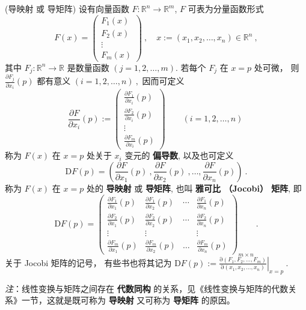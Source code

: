 \begin{definition}{(导映射 或 导矩阵)}
设有向量函数 $F:\mathbb{R}^{n}\rightarrow\mathbb{R}^{m}$, $F$ 可表为分量函数形式
$$
F(x)=\left(\begin{array}{c}
F_{1}(x)\\
F_{2}(x)\\
\vdots\\
F_{m}(x)
\end{array}\right)~,\quad x:=(x_{1},x_{2},\ldots,x_{n})\in\mathbb{R}^{n}~,
$$
其中 $F_{j}:\mathbb{R}^{n}\rightarrow\mathbb{R}$ 是数量函数 $(j=1,2,\ldots,m)$.
若每个 $F_{j}$ 在 $x=p$ 处可微， 则 ${\displaystyle \frac{\partial F_{j}}{\partial x_{i}}(p)}$
都有意义 $(i=1,2,\ldots,n)~,$ 因而可定义
$$
\frac{\partial F}{\partial x_{i}}(p):=\left(\begin{array}{c}
\frac{\partial F_{1}}{\partial x_{i}}(p)\\
\frac{\partial F_{2}}{\partial x_{i}}(p)\\
\vdots\\
\frac{\partial F_{m}}{\partial x_{i}}(p)
\end{array}\right)\qquad (i=1,2,\ldots,n)~
$$
称为 $F(x)$ 在 $x=p$ 处关于 $x_{i}$ 变元的 \textbf{偏导数}, 以及也可定义
\[
\mathrm{D}F(p)=(\frac{\partial F}{\partial x_{1}}(p)~,\frac{\partial F}{\partial x_{2}}(p)~,\ldots,\frac{\partial F}{\partial x_{n}}(p))~.
\]
称为 $F(x)$ 在 $x=p$ 处的 \textbf{导映射} 或 \textbf{导矩阵}, 也叫 \textbf{雅可比 （Jocobi）
矩阵}, 即
$$
\mathrm{D}F(p)=\left(\begin{array}{cccc}
\frac{\partial F_{1}}{\partial x_{1}}(p) & \frac{\partial F_{1}}{\partial x_{2}}(p) & \cdots & \frac{\partial F_{1}}{\partial x_{n}}(p)\\
\frac{\partial F_{2}}{\partial x_{1}}(p) & \frac{\partial F_{2}}{\partial x_{2}}(p) & \cdots & \frac{\partial F_{2}}{\partial x_{n}}(p)\\
\vdots & \vdots &  & \vdots\\
\frac{\partial F_{m}}{\partial x_{1}}(p) & \frac{\partial F_{m}}{\partial x_{2}}(p) & \ldots & \frac{\partial F_{m}}{\partial x_{n}}(p)
\end{array}\right)_{m\times n}~.
$$
关于 Jocobi 矩阵的记号， 有些书也将其记为 $\mathrm{D}F(p):={\displaystyle \left.\frac{\mathrm{\partial}(F_{1},F_{2},\ldots,F_{m})}{\mathrm{\partial}(x_{1},x_{2},\ldots,x_{n})}\right|_{x=p}~.}$
\end{definition}

\textsl{注}：线性变换与矩阵之间存在 \textbf{代数同构} 的关系，见《线性变换与矩阵的代数关系》一节，这就是既可称为 \textbf{导映射} 又可称为\textbf{ 导矩阵} 的原因。 


